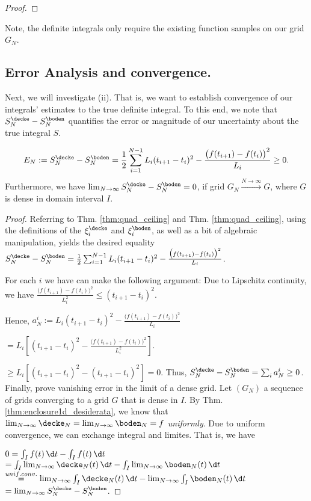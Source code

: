 \begin{thm}
\begin{proof}
\end{proof}

\end{thm}

Note, the definite integrals only require the existing function samples on our grid $G_N$. 

\subsection{Error Analysis and convergence.} Next, we will investigate (ii). That is, we want to establish convergence of our integrals' estimates to the true definite integral. To this end, we note that $S^\decke_N - S^\boden_N$ quantifies the error or magnitude of our uncertainty about the true integral $S$. 

\begin{thm}
\[E_N := S^\decke_N - S^\boden_N = \frac{1}{2} \sum_{i=1}^{N-1} L_i (t_{i+1} -t_i)^2 - \frac{\bigl(f(t_{i+1}) -f(t_i)\bigr)^2}{L_i} \geq 0.\] 
Furthermore, we have $\lim_{N \to \infty} S^\decke_N - S^\boden_N =0$, if grid $G_N \stackrel{N \to \infty}{\to} G$, where $G$ is dense in domain interval $I$. 

\begin{proof}
Referring to Thm. \ref{thm:quad_ceiling} and Thm. \ref{thm:quad_ceiling}, using the definitions of the $\xi^\decke_i$ and $\xi^\boden_i$, as well as a bit of algebraic manipulation, yields the desired equality 
$S^\decke_N - S^\boden_N = \frac{1}{2} \sum_{i=1}^{N-1} L_i (t_{i+1} -t_i)^2 - \frac{\bigl(f(t_{i+1}) -f(t_i)\bigr)^2}{L_i}$. 

For each $i$ we have can make the following argument:
Due to Lipschitz continuity, we have  
$\frac{\bigl(f(t_{i+1}) -f(t_i)\bigr)^2}{L_i^2}  \leq (t_{i+1}-t_i)^2$.

Hence,
$a_N^i:=L_i (t_{i+1} -t_i)^2 - \frac{\bigl(f(t_{i+1}) -f(t_i)\bigr)^2}{L_i}$

$=L_i [(t_{i+1} -t_i)^2 - \frac{\bigl(f(t_{i+1}) -f(t_i)\bigr)^2}{L_i^2}]$.

$\geq L_i [(t_{i+1} -t_i)^2 - (t_{i+1} -t_i)^2] =0$.
Thus, $S^\decke_N - S^\boden_N = \sum_i a_N^i \geq 0$. \\

Finally, prove vanishing error in the limit of a dense grid. 
Let $(G_N)$ a sequence of grids converging to a grid $G$ that is dense in $I$. By Thm. \ref{thm:enclosure1d_desiderata}, we know that $\lim_{N \to \infty} \decke_N = \lim_{N \to \infty}
    \boden_N = f$ \textit{uniformly}. Due to uniform convergence, we can exchange integral and limites. That is, we have 

$0 = \int_I f(t) \, \d t - \int_I f(t) \, \d t$
$=  \int_I \lim_{N \to \infty} \decke_N(t) \, \d t  - \int_I \lim_{N \to \infty}  \boden_N (t) \, \d t$
$\stackrel{unif. conv.}{=} \lim_{N \to \infty} \int_I \decke_N(t) \, \d t  - \lim_{N \to \infty} \int_I \boden_N (t) \, \d t$    
$=\lim_{N \to \infty} S^\decke_N - S^\boden_N $.






\end{proof}

\end{thm}

